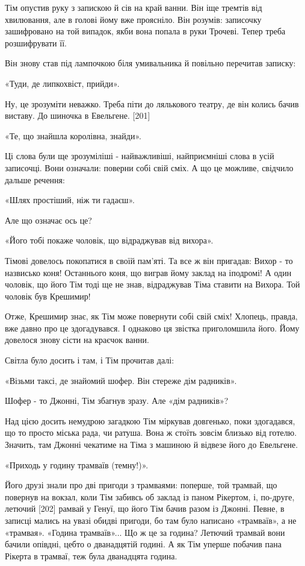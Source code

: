 Тім опустив руку з запискою й сів на край ванни. Він іще тремтів від хвилювання, але в голові йому вже проясніло. Він розумів: записочку зашифровано на той випадок, якби вона попала в руки Трочеві. Тепер треба розшифрувати її.

Він знову став під лампочкою біля умивальника й повільно перечитав записку:

«Туди, де липкохвіст, прийди».

Ну, це зрозуміти неважко. Треба піти до лялькового театру, де він колись бачив виставу. До шиночка в Евельгене. [201]

«Те, що знайшла королівна, знайди».

Ці слова були ще зрозуміліші - найважливіші, найприємніші слова в усій записочці. Вони означали: поверни собі свій сміх. А що це можливе, свідчило дальше речення:

«Шлях простіший, ніж ти гадаєш».

Але що означає ось це?

«Його тобі покаже чоловік, що відраджував від вихора».

Тімові довелось покопатися в своїй пам'яті. Та все ж він пригадав: Вихор - то назвисько коня! Останнього коня, що виграв йому заклад на іподромі! А один чоловік, що його Тім тоді ще не знав, відраджував Тіма ставити на Вихора. Той чоловік був Крешимир!

Отже, Крешимир знає, як Тім може повернути собі свій сміх! Хлопець, правда, вже давно про це здогадувався. І однаково ця звістка приголомшила його. Йому довелося знову сісти на краєчок ванни.

Світла було досить і там, і Тім прочитав далі:

«Візьми таксі, де знайомий шофер. Він стереже дім радників».

Шофер - то Джонні, Тім збагнув зразу. Але «дім радників»?

Над цією досить немудрою загадкою Тім міркував довгенько, поки здогадався, що то просто міська рада, чи ратуша. Вона ж стоїть зовсім близько від готелю. Значить, там Джонні чекатиме на Тіма з машиною й відвезе його до Евельгене.

«Приходь у годину трамваїв (темну!)».

Його друзі знали про дві пригоди з трамваями: поперше, той трамвай, що повернув на вокзал, коли Тім забивсь об заклад із паном Рікертом, і, по-друге, летючий [202] рамвай у Генуї, що його Тім бачив разом із Джонні. Певне, в записці мались на увазі обидві пригоди, бо там було написано «трамваїв», а не «трамвая». «Година трамваїв»... Що ж це за година? Летючий трамвай вони бачили опівдні, цебто о дванадцятій годині. А як Тім уперше побачив пана Рікерта в трамваї, теж була дванадцята година.

